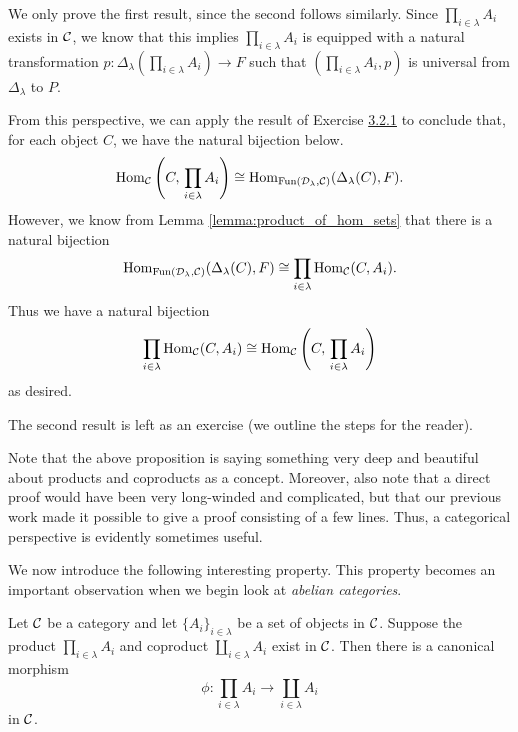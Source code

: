     \begin{prf}
        We only prove the first result, since the second follows similarly. 
        Since $\prod_{i \in \lambda}A_i$ exists in $\mathcal{C}$, we know that this implies 
        $\prod_{i \in \lambda}A_i$ is equipped with a natural transformation 
        $p: \Delta_{\lambda}\left(\prod_{i \in \lambda}A_i\right) \to F$ such that 
        $(\prod_{i \in \lambda}A_i, p)$ is universal from $\Delta_{\lambda}$ to $P$. 

        From this perspective, we can apply the result of Exercise \hyperref[exercise:universality_bijection]{3.2.1} 
        to conclude that, for each object $C$, we have the natural bijection below. 
        \[
            \operatorname{\mathrm{Hom}}_{\mathcal{C}}\left(C, \,\prod_{i \in \lambda}A_i\right) \cong
            \operatorname{\mathrm{Hom}}_{\text{Fun}(\mathcal{D}_{\lambda}, \mathcal{C})}(\Delta_{\lambda}(C), F).
        \]
        However, we know from Lemma \ref{lemma:product_of_hom_sets} that there is a natural bijection 
        \[
            \operatorname{\mathrm{Hom}}_{\text{Fun}(\mathcal{D}_{\lambda}, \mathcal{C})}(\Delta_{\lambda}(C), F)
            \cong 
            \prod_{i \in \lambda}\operatorname{\mathrm{Hom}}_{\mathcal{C}}(C, A_i).
        \]
        Thus we have a natural bijection
        \[
            \prod_{i \in \lambda}\operatorname{\mathrm{Hom}}_{\mathcal{C}}(C, A_i) \cong \operatorname{\mathrm{Hom}}_{\mathcal{C}}\left(C, \,\prod_{i \in \lambda}A_i\right)
        \]
        as desired.

        The second result is left as an exercise (we outline the steps for the reader).

    \end{prf}

    \begin{remark}
        Note that the above proposition is saying something very deep and beautiful 
        about products and coproducts as a concept. Moreover, also note that a direct proof would have been very long-winded 
        and complicated, but that our previous work made it possible to give a proof consisting 
        of a few lines. Thus, a categorical perspective is evidently sometimes useful. 
    \end{remark}

    We now introduce the following interesting property. This property becomes 
    an important observation when we begin look at \emph{abelian categories}. 

    \begin{proposition}
        Let $\mathcal{C}$ be a category and let $\{A_i\}_{i \in \lambda}$ be a set of objects in $\mathcal{C}$.
        Suppose the product $\prod_{i \in \lambda}A_i$ and coproduct $\coprod_{i \in \lambda}A_i$
        exist in $\mathcal{C}$. Then there is a canonical morphism 
        \[
            \phi:\prod_{i \in \lambda}A_i \to \coprod_{i \in \lambda}A_i 
        \]
        in $\mathcal{C}$.
    \end{proposition}

